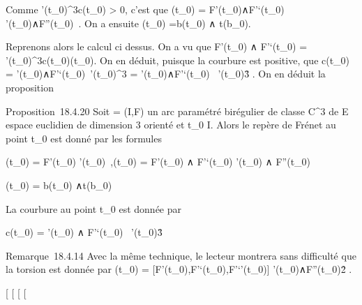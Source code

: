 \documentclass[]{article}
\begin{document}
Comme \theta'(t_0)^3c(t_0) > 0,
c'est que \vecb(t_0) =
F'(t_0)∧F'`(t_0) \over
\F'(t_0)∧F''(t_0)\
. On a ensuite \vecn(t_0)
=\vec b(t_0) ∧\vec
t(b_0).

Reprenons alors le calcul ci dessus. On a vu que F'(t_0) ∧
F'`(t_0) =
\theta'(t_0)^3c(t_0)\vecb(t_0).
On en déduit, puisque la courbure est positive, que c(t_0) =
\F'(t_0)∧F'`(t_0)\
\over \theta'(t_0)^3 =
\F'(t_0)∧F'`(t_0)\
\over
\F'(t_0)\^3
. On en déduit la proposition

Proposition~18.4.20 Soit \Gamma = (I,F) un arc paramétré birégulier de classe
C^3 de E espace euclidien de dimension 3 orienté et
t_0 \in I. Alors le repère de Frénet au point t_0 est
donné par les formules

\vect(t_0) = F'(t_0)
\over
\F'(t_0)\
,\quad \vecb(t_0) =
F'(t_0) ∧ F'`(t_0) \over
\F'(t_0) ∧
F''(t_0)\

\vecn(t_0) =\vec
b(t_0) ∧\vec t(b_0)

La courbure au point t_0 est donnée par

c(t_0) = \F'(t_0) ∧
F'`(t_0)\ \over
\F'(t_0)\^3

Remarque~18.4.14 Avec la même technique, le lecteur montrera sans
difficulté que la torsion est donnée par \tau(t_0) =
[F'(t_0),F'`(t_0),F'`'(t_0)]
\over
\F'(t_0)∧F''(t_0)\^2
.

[
[
[
[
\end{document}
